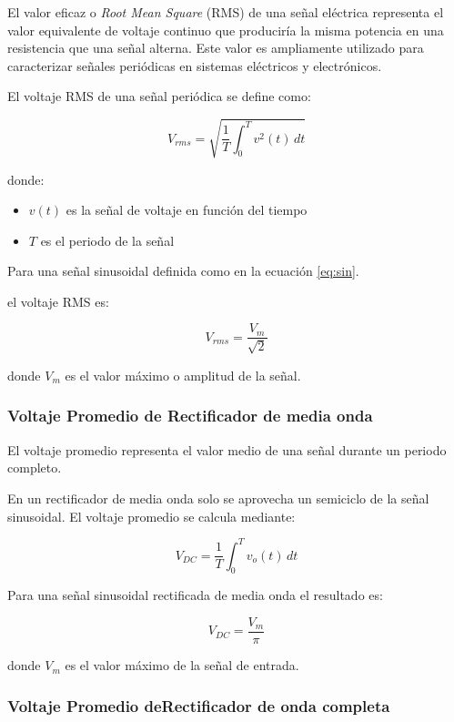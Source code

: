 \documentclass[journal]{IEEEtran}
\begin{document}
El valor eficaz o \textit{Root Mean Square} (RMS) de una señal eléctrica representa el valor equivalente de voltaje continuo que produciría la misma potencia en una resistencia que una señal alterna. Este valor es ampliamente utilizado para caracterizar señales periódicas en sistemas eléctricos y electrónicos.

El voltaje RMS de una señal periódica se define como:

\begin{equation}
V_{rms} = \sqrt{\frac{1}{T}\int_{0}^{T} v^2(t)\, dt}
\end{equation}

donde:

\begin{itemize}
\item $v(t)$ es la señal de voltaje en función del tiempo
\item $T$ es el periodo de la señal
\end{itemize}

Para una señal sinusoidal definida como en la ecuación \ref{eq:sin}.

el voltaje RMS es:

\begin{equation}
V_{rms} = \frac{V_m}{\sqrt{2}}
\end{equation}

donde $V_m$ es el valor máximo o amplitud de la señal.


\subsubsection{Voltaje Promedio de Rectificador de media onda}
El voltaje promedio representa el valor medio de una señal durante un periodo completo.

En un rectificador de media onda solo se aprovecha un semiciclo de la señal sinusoidal. El voltaje promedio se calcula mediante:

\begin{equation}
V_{DC} = \frac{1}{T}\int_{0}^{T} v_o(t)\, dt
\end{equation}

Para una señal sinusoidal rectificada de media onda el resultado es:

\begin{equation}
V_{DC} = \frac{V_m}{\pi}
\end{equation}

donde $V_m$ es el valor máximo de la señal de entrada.

\subsubsection{Voltaje Promedio deRectificador de onda completa}
\end{document}
